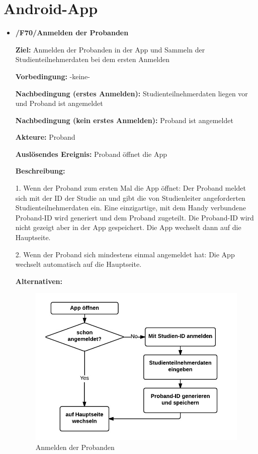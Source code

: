 \documentclass[a4paper]{scrreprt}
\begin{document}
    \newpage
    \section{\gls{Android-App}}

        \begin{itemize}
            \item \textbf{/F70/Anmelden der \gls{Proband}en}

                \par \textbf{Ziel: }Anmelden der \gls{Proband}en in der App und Sammeln der Studienteilnehmerdaten bei dem ersten Anmelden
                \par \textbf{Vorbedingung: }-keine-
                \par \textbf{Nachbedingung (erstes Anmelden): }Studienteilnehmerdaten liegen vor und \gls{Proband} ist angemeldet
                \par \textbf{Nachbedingung (kein erstes Anmelden): }\gls{Proband} ist angemeldet
                \par \textbf{Akteure: }\gls{Proband}
                \par \textbf{Auslösendes Ereignis: }\gls{Proband} öffnet die App
                \par \textbf{Beschreibung: }
                \par 1. Wenn der \gls{Proband} zum ersten Mal die App öffnet: Der \gls{Proband} meldet sich mit der ID der Studie an und gibt die von \gls{Studienleiter} angeforderten Studienteilnehmerdaten ein. Eine einzigartige, mit dem Handy verbundene \gls{Proband}-ID wird generiert und dem \gls{Proband} zugeteilt. Die \gls{Proband}-ID wird nicht gezeigt aber in der App gespeichert. Die App wechselt dann auf die Hauptseite.
                \par 2. Wenn der \gls{Proband} sich mindestens einmal angemeldet hat: Die App wechselt automatisch auf die Hauptseite.
                \par \textbf{Alternativen: }
                \begin{figure}[ht]
                    \centering
                    \includegraphics[scale=1]{AppAnmelden.jpeg}
                    \caption{Anmelden der \gls{Proband}en}
                \end{figure}



\end{itemize}
\end{document}
